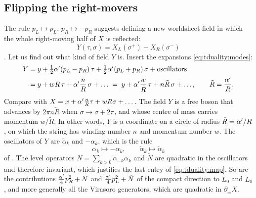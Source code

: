 \subsection{Flipping the right-movers}

The rule $p_L\mapsto p_L$, $p_R\mapsto-p_R$ suggests defining a new worldsheet field in which the
whole right-moving half of $X$ is reflected:
\begin{equation}\label{eq:tduality:Y}
  Y(\tau,\sigma)=X_L(\sigma^+)-X_R(\sigma^-)
\end{equation}
. Let us find out what kind of field
$Y$ is. Insert the expansions \eqref{eq:tduality:modes}:
\begin{align}
  Y&=y+\tfrac12\alpha'(p_L-p_R)\,\tau+\tfrac12\alpha'(p_L+p_R)\,\sigma+\text{oscillators}\notag\\
   &=y+wR\,\tau+\alpha'\frac nR\,\sigma+\dots
    \;=\;y+\alpha'\frac{w}{\tilde R}\,\tau+n\tilde R\,\sigma+\dots,\qquad\tilde R=\frac{\alpha'}{R}.
    \label{eq:tduality:Ymodes}
\end{align}
Compare with $X=x+\alpha'\frac nR\tau+wR\sigma+\dots$. The field $Y$ is a free boson that advances by
$2\pi n\tilde R$ when $\sigma\to\sigma+2\pi$, and whose centre of mass carries momentum
$w/\tilde R$. In other words, $Y$ is a coordinate on a circle of radius $\tilde R=\alpha'/R$, on which
the string has winding number $n$ and momentum number $w$. The oscillators of $Y$ are
$\tilde\alpha_k$ and $-\alpha_k$, which is the rule
\begin{equation}\label{eq:tduality:osc}
  \alpha_k\longmapsto-\alpha_k,\qquad\tilde\alpha_k\longmapsto\tilde\alpha_k
\end{equation}
of . The level operators
$N=\sum_{k>0}\alpha_{-k}\alpha_k$ and $\tilde N$ are quadratic in the oscillators and therefore
invariant, which justifies the last entry of \eqref{eq:tduality:map}. So are the contributions
$\frac{\alpha'}4p_R^2+N$ and $\frac{\alpha'}4p_L^2+\tilde N$ of the compact direction to $L_0$ and
$\tilde L_0$, and more generally all the Virasoro generators, which are quadratic in
$\partial_\pm X$.

